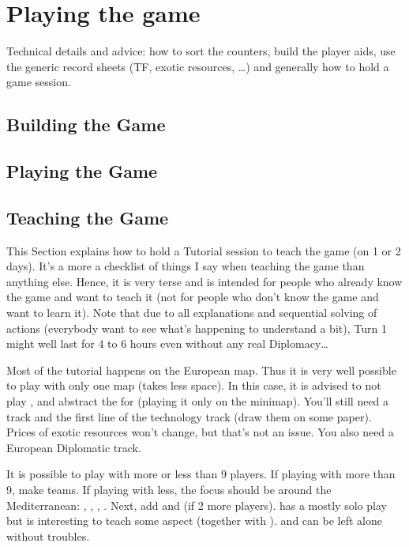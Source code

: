 
\chapter{Playing the game}\label{chapter:Playing}

\begin{todo}
  Technical details and advice: how to sort the counters, build the player
  aids, use the generic record sheets (TF, exotic resources, \ldots) and
  generally how to hold a game session.
\end{todo}

\section{Building the Game}

\section{Playing the Game}

\section{Teaching the Game}
This Section explains how to hold a Tutorial session to teach the game (on 1
or 2 days). It's a more a checklist of things I say when teaching the game
than anything else. Hence, it is very terse and is intended for people who
already know the game and want to teach it (not for people who don't know the
game and want to learn it). Note that due to all explanations and sequential
solving of actions (everybody want to see what's happening to understand a
bit), Turn 1 might well last for 4 to 6 hours even without any real
Diplomacy\ldots

Most of the tutorial happens on the European map. Thus it is very well
possible to play with only one map (takes less space). In this case, it is
advised to not play \POR, and abstract the \ROTW for \HIS (playing it only on
the minimap). You'll still need a \STAB track and the first line of the
technology track (draw them on some paper). Prices of exotic resources won't
change, but that's not an issue. You also need a European Diplomatic track.

It is possible to play with more or less than 9 players. If playing with more
than 9, make teams. If playing with less, the focus should be around the
Mediterranean: \TUR, \VEN, \FRA, \HIS. Next, add \POL and \RUS (if 2 more
players). \POR has a mostly solo play but is interesting to teach some \ROTW
aspect (together with \HIS). \ANG and \DAN can be left alone without troubles.

